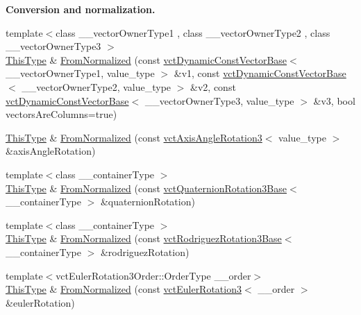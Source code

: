 \begin{Indent}{\bf Conversion and normalization.}
\begin{DoxyCompactItemize}
\item 
{\footnotesize template$<$class \+\_\+\+\_\+vector\+Owner\+Type1 , class \+\_\+\+\_\+vector\+Owner\+Type2 , class \+\_\+\+\_\+vector\+Owner\+Type3 $>$ }\\\hyperlink{classvct_matrix_rotation3_base_a027be766cb10ca3c2ad8e85c28ed0af9}{This\+Type} \& \hyperlink{classvct_matrix_rotation3_base_a454968ed7ecbb2aefb9c63a8fe49df52}{From\+Normalized} (const \hyperlink{classvct_dynamic_const_vector_base}{vct\+Dynamic\+Const\+Vector\+Base}$<$ \+\_\+\+\_\+vector\+Owner\+Type1, value\+\_\+type $>$ \&v1, const \hyperlink{classvct_dynamic_const_vector_base}{vct\+Dynamic\+Const\+Vector\+Base}$<$ \+\_\+\+\_\+vector\+Owner\+Type2, value\+\_\+type $>$ \&v2, const \hyperlink{classvct_dynamic_const_vector_base}{vct\+Dynamic\+Const\+Vector\+Base}$<$ \+\_\+\+\_\+vector\+Owner\+Type3, value\+\_\+type $>$ \&v3, bool vectors\+Are\+Columns=true)
\item 
\hyperlink{classvct_matrix_rotation3_base_a027be766cb10ca3c2ad8e85c28ed0af9}{This\+Type} \& \hyperlink{classvct_matrix_rotation3_base_acda2e44cd70ae8b945712f9f7996bccf}{From\+Normalized} (const \hyperlink{classvct_axis_angle_rotation3}{vct\+Axis\+Angle\+Rotation3}$<$ value\+\_\+type $>$ \&axis\+Angle\+Rotation)
\item 
{\footnotesize template$<$class \+\_\+\+\_\+container\+Type $>$ }\\\hyperlink{classvct_matrix_rotation3_base_a027be766cb10ca3c2ad8e85c28ed0af9}{This\+Type} \& \hyperlink{classvct_matrix_rotation3_base_a343aca40687cf93638400f363dc44379}{From\+Normalized} (const \hyperlink{classvct_quaternion_rotation3_base}{vct\+Quaternion\+Rotation3\+Base}$<$ \+\_\+\+\_\+container\+Type $>$ \&quaternion\+Rotation)
\item 
{\footnotesize template$<$class \+\_\+\+\_\+container\+Type $>$ }\\\hyperlink{classvct_matrix_rotation3_base_a027be766cb10ca3c2ad8e85c28ed0af9}{This\+Type} \& \hyperlink{classvct_matrix_rotation3_base_a002538ebd9db06ea0c74ce82efb788da}{From\+Normalized} (const \hyperlink{classvct_rodriguez_rotation3_base}{vct\+Rodriguez\+Rotation3\+Base}$<$ \+\_\+\+\_\+container\+Type $>$ \&rodriguez\+Rotation)
\item 
{\footnotesize template$<$vct\+Euler\+Rotation3\+Order\+::\+Order\+Type \+\_\+\+\_\+order$>$ }\\\hyperlink{classvct_matrix_rotation3_base_a027be766cb10ca3c2ad8e85c28ed0af9}{This\+Type} \& \hyperlink{classvct_matrix_rotation3_base_a89512851c27c7fda645431fa0838c5dc}{From\+Normalized} (const \hyperlink{classvct_euler_rotation3}{vct\+Euler\+Rotation3}$<$ \+\_\+\+\_\+order $>$ \&euler\+Rotation)
\end{DoxyCompactItemize}
\end{Indent}
